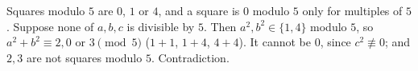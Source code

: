 Squares modulo $5$ are $0$, $1$ or $4$, and a square is $0$ modulo $5$ only for multiples of $5$. Suppose none of $a,b,c$ is divisible by $5$. Then $a^2,b^2\in\{1,4\}$ modulo $5$, so $a^2+b^2\equiv2,0$ or $3\pmod5$ ($1+1$, $1+4$, $4+4$). It cannot be $0$, since $c^2\not\equiv0$; and $2,3$ are not squares modulo $5$. Contradiction.
